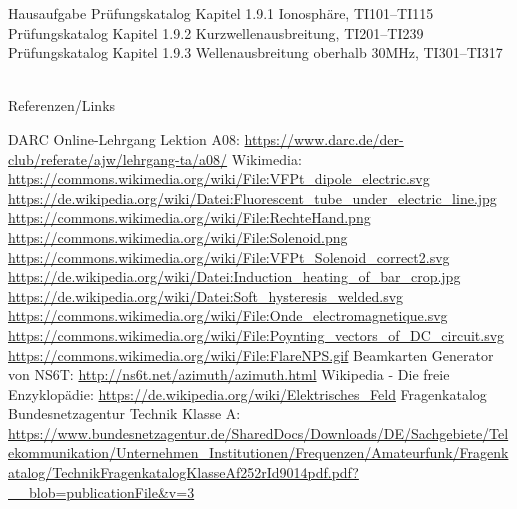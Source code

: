 \begin{frame}
  \begin{exampleblock}{Hausaufgabe}
    Prüfungskatalog Kapitel 1.9.1 Ionosphäre, TI101--TI115\\
    Prüfungskatalog Kapitel 1.9.2 Kurzwellenausbreitung, TI201--TI239\\
    Prüfungskatalog Kapitel 1.9.3 Wellenausbreitung oberhalb 30MHz, TI301--TI317
  \end{exampleblock}
\end{frame}

\renewcommand{\refname}{Referenzen}

\hypertarget{refs}{}
\textcolor{white}{} \\ %
\Large Referenzen/Links
\footnotesize

\begin{thebibliography}{}
    DARC Online-Lehrgang Lektion A08:
    \url{https://www.darc.de/der-club/referate/ajw/lehrgang-ta/a08/}
    Wikimedia:
    \url{https://commons.wikimedia.org/wiki/File:VFPt_dipole_electric.svg}
    \url{https://de.wikipedia.org/wiki/Datei:Fluorescent_tube_under_electric_line.jpg}
    \url{https://commons.wikimedia.org/wiki/File:RechteHand.png}
    \url{https://commons.wikimedia.org/wiki/File:Solenoid.png}
    \url{https://commons.wikimedia.org/wiki/File:VFPt_Solenoid_correct2.svg}
    \url{https://de.wikipedia.org/wiki/Datei:Induction_heating_of_bar_crop.jpg}
    \url{https://de.wikipedia.org/wiki/Datei:Soft_hysteresis_welded.svg}
    \url{https://commons.wikimedia.org/wiki/File:Onde_electromagnetique.svg}
    \url{https://commons.wikimedia.org/wiki/File:Poynting_vectors_of_DC_circuit.svg}
    \url{https://commons.wikimedia.org/wiki/File:FlareNPS.gif}
    \url{}
    \url{}
    \url{}
    \url{}
    Beamkarten Generator von NS6T:
    \url{http://ns6t.net/azimuth/azimuth.html}
      Wikipedia - Die freie Enzyklopädie:
    \url{https://de.wikipedia.org/wiki/Elektrisches_Feld}
     Fragenkatalog Bundesnetzagentur Technik Klasse A:
    \url{https://www.bundesnetzagentur.de/SharedDocs/Downloads/DE/Sachgebiete/Telekommunikation/Unternehmen_Institutionen/Frequenzen/Amateurfunk/Fragenkatalog/TechnikFragenkatalogKlasseAf252rId9014pdf.pdf?__blob=publicationFile&v=3}
\end{thebibliography}


